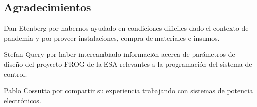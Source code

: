 \documentclass[11pt, titlepage]{article}
\begin{document}
\newpage



\null\newpage
\clearpage



\null\newpage
\clearpage



\null\newpage
\clearpage



\null\newpage
\clearpage




\null\newpage
\clearpage



\null\newpage
\clearpage



\null\newpage
\clearpage




\null\newpage
\clearpage



\null\newpage
\clearpage



\null\newpage
\clearpage

\subsection*{Agradecimientos}
Dan Etenberg por habernos ayudado en condiciones dificiles dado el contexto de pandemia y por proveer instalaciones, compra de materiales e insumos. 

\medskip

Stefan Query por haber intercambiado información acerca de parámetros de diseño del proyecto FROG de la ESA relevantes a la programación del sistema de control.

\medskip

Pablo Cossutta por compartir su experiencia trabajando con sistemas de potencia electrónicos. 



% 
%

\null\newpage
\clearpage


\end{document}
